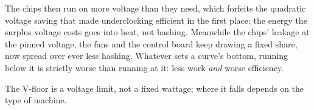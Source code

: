 The chips then run on more voltage than they need, which forfeits the quadratic voltage saving that made underclocking efficient in the first place: the energy the surplus voltage costs goes into heat, not hashing. Meanwhile the chips' leakage at the pinned voltage, the fans and the control board keep drawing a fixed share, now spread over ever less hashing. Whatever sets a curve's bottom, running below it is strictly worse than running at it: less work \emph{and} worse efficiency. %

The V-floor is a voltage limit, not a fixed wattage; where it falls depends on the type of machine. %

